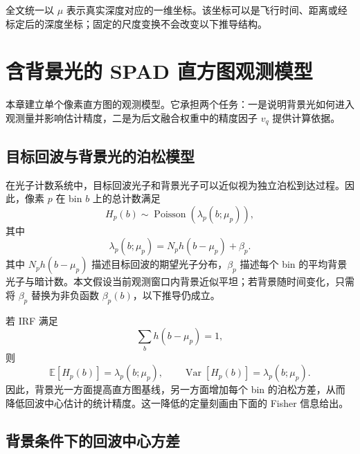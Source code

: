 \documentclass[11pt,a4paper]{ctexart}
\numberwithin{equation}{section}
\newcommand{\E}{\mathbb{E}}
\newcommand{\Var}{\operatorname{Var}}
\begin{document}
全文统一以 $\mu$ 表示真实深度对应的一维坐标。该坐标可以是飞行时间、距离或经标定后的深度坐标；固定的尺度变换不会改变以下推导结构。

\section{含背景光的 SPAD 直方图观测模型}
\label{sec:spad}

本章建立单个像素直方图的观测模型。它承担两个任务：一是说明背景光如何进入观测量并影响估计精度，二是为后文融合权重中的精度因子 $v_q$ 提供计算依据。

\subsection{目标回波与背景光的泊松模型}

在光子计数系统中，目标回波光子和背景光子可以近似视为独立泊松到达过程。因此，像素 $p$ 在 bin $b$ 上的总计数满足
\begin{equation}
    H_p(b)
    \sim
    \operatorname{Poisson}\!\left(\lambda_p(b;\mu_p)\right),
    \label{eq:poisson_obs}
\end{equation}
其中
\begin{equation}
    \boxed{
    \lambda_p(b;\mu_p)
    =
    N_p h(b-\mu_p)+\beta_p
    }.
    \label{eq:lambda_background}
\end{equation}
其中 $N_p h(b-\mu_p)$ 描述目标回波的期望光子分布，$\beta_p$ 描述每个 bin 的平均背景光子与暗计数。本文假设当前观测窗口内背景近似平坦；若背景随时间变化，只需将 $\beta_p$ 替换为非负函数 $\beta_p(b)$，以下推导仍成立。

若 IRF 满足
\begin{equation}
    \sum_b h(b-\mu_p)=1,
    \label{eq:irf_norm}
\end{equation}
则
\begin{equation}
    \E[H_p(b)] = \lambda_p(b;\mu_p),
    \qquad
    \Var[H_p(b)] = \lambda_p(b;\mu_p).
    \label{eq:poisson_moments_bg}
\end{equation}
因此，背景光一方面提高直方图基线，另一方面增加每个 bin 的泊松方差，从而降低回波中心估计的统计精度。这一降低的定量刻画由下面的 Fisher 信息给出。

\subsection{背景条件下的回波中心方差}
\end{document}
